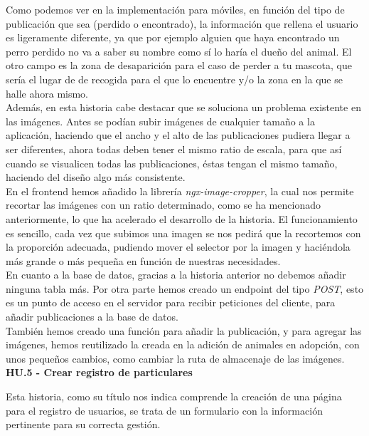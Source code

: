 Como podemos ver en la implementación para móviles, en función del tipo de publicación que sea (perdido o encontrado), la información que rellena el usuario es ligeramente diferente, ya que por ejemplo alguien que haya encontrado un perro perdido no va a saber su nombre como sí lo haría el dueño del animal. El otro campo es la zona de desaparición para el caso de perder a tu mascota, que sería el lugar de de recogida para el que lo encuentre y/o la zona en la que se halle ahora mismo. \\

Además, en esta historia cabe destacar que se soluciona un problema existente en las imágenes. Antes se podían subir imágenes de cualquier tamaño a la aplicación, haciendo que el ancho y el alto de las publicaciones pudiera llegar a ser diferentes, ahora todas deben tener el mismo ratio de escala, para que así cuando se visualicen todas las publicaciones, éstas tengan el mismo tamaño, haciendo del diseño algo más consistente.\\

En el frontend hemos añadido la librería \textit{ngx-image-cropper}, la cual nos permite recortar las imágenes con un ratio determinado, como se ha mencionado anteriormente, lo que ha acelerado el desarrollo de la historia. El funcionamiento es sencillo, cada vez que subimos una imagen se nos pedirá que la recortemos con la proporción adecuada, pudiendo mover el selector por la imagen y haciéndola más grande o más pequeña en función de nuestras necesidades. \\

En cuanto a la base de datos, gracias a la historia anterior no debemos añadir ninguna tabla más. Por otra parte hemos creado un endpoint del tipo \textit{POST}, esto es un punto de acceso en el servidor para recibir peticiones del cliente, para añadir publicaciones a la base de datos. \\

También hemos creado una función para añadir la publicación, y para agregar las imágenes, hemos reutilizado la creada en la adición de animales en adopción, con unos pequeños cambios, como cambiar la ruta de almacenaje de las imágenes. \\ 




\Large{\textbf{HU.5 - Crear registro de particulares}}

Esta historia, como su título nos indica comprende la creación de una página para el registro de usuarios, se trata de un formulario con la información pertinente para su correcta gestión.\\

